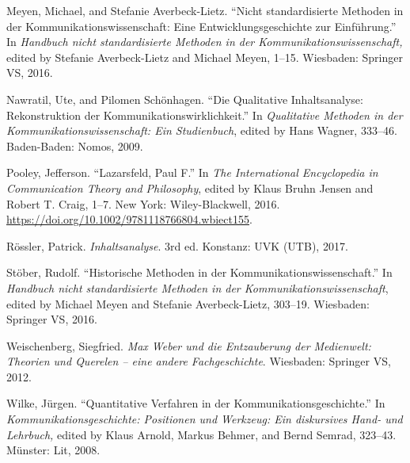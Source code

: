 \documentclass{tufte-handout}
\begin{document}
\begin{hangparas}{.25in}{1}
Meyen, Michael, and Stefanie Averbeck-Lietz. ``Nicht standardisierte
Methoden in der Kommunikationswissenschaft: Eine Entwicklungsgeschichte
zur Einführung.'' In \emph{Handbuch nicht standardisierte Methoden in
der Kommunikationswissenschaft,} edited by Stefanie Averbeck-Lietz and
Michael Meyen, 1--15. Wiesbaden: Springer VS, 2016.

Nawratil, Ute, and Pilomen Schönhagen. ``Die Qualitative Inhaltsanalyse:
Rekonstruktion der Kommunikationswirklichkeit.'' In \emph{Qualitative
Methoden in der Kommunikationswissenschaft: Ein Studienbuch}, edited by
Hans Wagner, 333--46. Baden-Baden: Nomos, 2009.

Pooley, Jefferson. ``Lazarsfeld, Paul F.'' In \emph{The International
Encyclopedia in Communication Theory and Philosophy}, edited by Klaus
Bruhn Jensen and Robert T. Craig, 1--7. New York: Wiley-Blackwell, 2016.
\url{https://doi.org/10.1002/9781118766804.wbiect155}.

Rössler, Patrick. \emph{Inhaltsanalyse}. 3rd ed. Konstanz: UVK (UTB),
2017.

Stöber, Rudolf. ``Historische Methoden in der
Kommunikationswissenschaft.'' In \emph{Handbuch nicht standardisierte
Methoden in der Kommunikationswissenschaft}, edited by Michael Meyen and
Stefanie Averbeck-Lietz, 303--19. Wiesbaden: Springer VS, 2016.

Weischenberg, Siegfried. \emph{Max Weber und die Entzauberung der
Medienwelt: Theorien und Querelen -- eine andere Fachgeschichte}.
Wiesbaden: Springer VS, 2012.

Wilke, Jürgen. ``Quantitative Verfahren in der
Kommunikationsgeschichte.'' In \emph{Kommunikationsgeschichte:
Positionen und Werkzeug: Ein diskursives Hand- und Lehrbuch,} edited by
Klaus Arnold, Markus Behmer, and Bernd Semrad, 323--43. Münster: Lit,
2008.



\end{hangparas}
\end{document}
